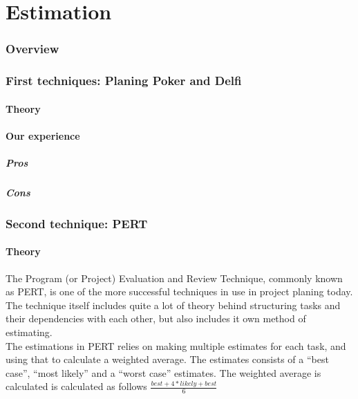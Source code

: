 \part{Estimation}
\section{Overview}
\section{First techniques: Planing Poker and Delfi}
\subsection{Theory}

\subsection{Our experience}

\subsubsection{Pros}

\subsubsection{Cons}

\section{Second technique: PERT}
\subsection{Theory}

The Program (or Project) Evaluation and Review Technique, commonly known as PERT, is one of the more successful techniques in use in project planing today. The technique itself includes quite a lot of theory behind structuring tasks and their dependencies with each other, but also includes it own method of estimating.\\

The estimations in PERT relies on making multiple estimates for each task, and using that to calculate a weighted average. The estimates consists of a ``best case'', ``most likely'' and a ``worst case'' estimates. The weighted average is calculated is calculated as follows
$\frac{best+4*likely+best}{6}$


